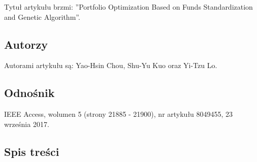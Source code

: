 \documentclass[polish,envcountsect,10pt]{article}
\begin{document}
Tytuł artykułu brzmi: ''Portfolio Optimization Based on Funds Standardization and Genetic Algorithm''.

\subsection{Autorzy}

Autorami artykułu są: Yao-Hsin Chou, Shu-Yu Kuo oraz Yi-Tzu Lo.

\subsection{Odnośnik}

IEEE Access, wolumen 5 (strony 21885 - 21900), nr artykułu 8049455, 23 września 2017.

\subsection{Spis treści}
\end{document}
